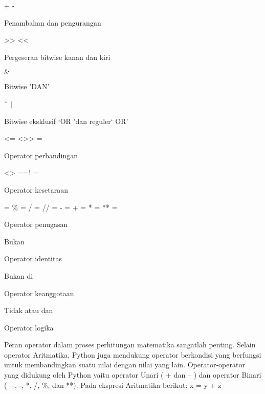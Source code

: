 + - \par
\noindent 
Penambahan dan pengurangan \par
\vspace{12pt}
\noindent 
>> << \par
\noindent 
Pergeseran bitwise kanan dan kiri \par
\vspace{12pt}
\noindent 
 $  \&  $ \par
\noindent 
Bitwise 'DAN' \par
\vspace{12pt}
\noindent 
 $  \string^  $  $  \vert  $ \par
\noindent 
Bitwise eksklusif `OR 'dan reguler` OR' \par
\vspace{12pt}
\noindent 
<= <>> = \par
\noindent 
Operator perbandingan \par
\vspace{12pt}
\noindent 
<> ==! = \par
\noindent 
Operator kesetaraan \par
\vspace{12pt}
\noindent 
= $  \%  $ = / = // = - = + = * = ** = \par
\noindent 
Operator penugasan \par
\vspace{12pt}
\noindent 
Bukan \par
\noindent 
Operator identitas \par
\vspace{12pt}
\noindent 
Bukan di \par
\noindent 
Operator keanggotaan \par
\vspace{12pt}
\noindent 
Tidak atau dan \par
\noindent 
Operator logika \par
\vspace{12pt}
\noindent 
Peran operator dalam proses perhitungan matematika sangatlah penting. Selain $  $operator Aritmatika, Python juga mendukung $  $operator berkondisi $  $yang berfungsi untuk membandingkan suatu nilai dengan nilai yang lain. Operator-operator yang didukung oleh Python yaitu $  $operator Unari $  $( + dan – ) dan $  $operator Binari $  $( +, -, *, /,  $  \%  $, dan **). Pada ekspresi Aritmatika berikut:\vspace{\baselineskip}
\vspace{\baselineskip}
x = y + z \par
